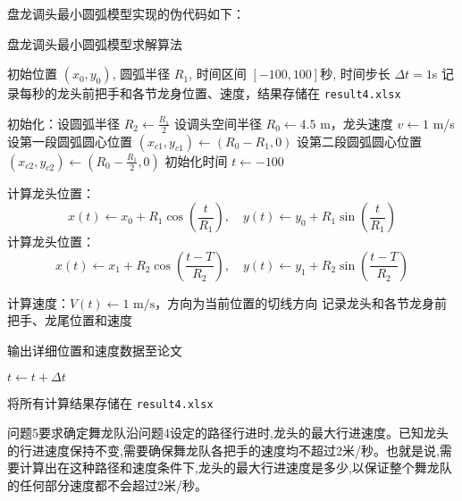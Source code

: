 
盘龙调头最小圆弧模型实现的伪代码如下：
\begin{breakablealgorithm}
	\caption{盘龙调头最小圆弧模型求解算法}
	\begin{algorithmic}[1]
		\Require 初始位置 $(x_0, y_0)$, 圆弧半径 $R_1$, 时间区间 $[-100, 100]$秒, 时间步长 $\Delta t = 1$s
		\Ensure 记录每秒的龙头前把手和各节龙身位置、速度，结果存储在 \texttt{result4.xlsx}
		
		\State 初始化：设圆弧半径 $R_2 \gets \frac{R_1}{2}$
		\State 设调头空间半径 $R_0 \gets 4.5$ m，龙头速度 $v \gets 1$ m/s
		\State 设第一段圆弧圆心位置 $(x_{c1}, y_{c1}) \gets (R_0 - R_1, 0)$
		\State 设第二段圆弧圆心位置 $(x_{c2}, y_{c2}) \gets (R_0 - \frac{R_1}{2}, 0)$
		\State 初始化时间 $t \gets -100$
		
		 
		\State 计算龙头位置： 
		\[
		x(t) \gets x_0 + R_1 \cos\left(\frac{t}{R_1}\right), \quad y(t) \gets y_0 + R_1 \sin\left(\frac{t}{R_1}\right)
		\]
		\Else {}
		\State 计算龙头位置： 
		\[
		x(t) \gets x_1 + R_2 \cos\left(\frac{t - T}{R_2}\right), \quad y(t) \gets y_1 + R_2 \sin\left(\frac{t - T}{R_2}\right)
		\]
		\EndIf
		
		\State 计算速度：$V(t) \gets 1 \text{ m/s}$，方向为当前位置的切线方向
		\State 记录龙头和各节龙身前把手、龙尾位置和速度
		
		\State 输出详细位置和速度数据至论文
		\EndIf
		
		\State $t \gets t + \Delta t$
		\EndWhile
		
		\State 将所有计算结果存储在 \texttt{result4.xlsx}
	\end{algorithmic}
\end{breakablealgorithm}












问题5要求确定舞龙队沿问题4设定的路径行进时,龙头的最大行进速度。已知龙头的行进速度保持不变,需要确保舞龙队各把手的速度均不超过2米/秒。也就是说,需要计算出在这种路径和速度条件下,龙头的最大行进速度是多少,以保证整个舞龙队的任何部分速度都不会超过2米/秒。


